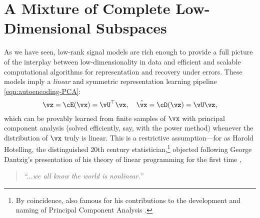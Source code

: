\documentclass[../../book-main.tex]{subfiles}
\begin{document}
\section{A Mixture of Complete Low-Dimensional Subspaces}%
\label{sec:ica}
As we have seen, low-rank signal models are rich enough to provide a full picture of the interplay between low-dimensionality in data and efficient and scalable computational algorithms for representation and recovery under errors. 
These models imply a \textit{linear} and symmetric representation learning pipeline \eqref{eqn:autoencoding-PCA}: 
\begin{equation*}
    \vz = \cE(\vx) = \vU^\top \vx, \quad \hat{\vx} = \cD(\vz) = \vU \vz,
\end{equation*}
which can be provably learned from finite samples of $\vx$ with principal component analysis (solved efficiently, say, with the power method) whenever the distribution of $\vx$ truly is linear.
This is a restrictive assumption---for as Harold Hotelling, the distinguished 20th century statistician,\footnote{By coincidence, also famous for his contributions to the development and naming of Principal Component Analysis \cite{Hotelling1933}.} objected following George Dantzig's presentation of his theory of linear programming for the first time \cite{Dantzig2002-eh},
\begin{quote}
\centering
    \textit{``...we all know the world is nonlinear.''}
\end{quote}
\end{document}
